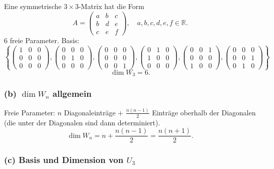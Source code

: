 \documentclass[a4paper,12pt]{article}
\begin{document}
Eine symmetrische $3\times 3$-Matrix hat die Form
\[
A = \begin{pmatrix} a & b & c \\ b & d & e \\ c & e & f \end{pmatrix}, \quad a, b, c, d, e, f \in \mathbb{R}.
\]
6 freie Parameter. Basis:
\[
\left\{
\begin{pmatrix} 1 & 0 & 0 \\ 0 & 0 & 0 \\ 0 & 0 & 0 \end{pmatrix},
\begin{pmatrix} 0 & 0 & 0 \\ 0 & 1 & 0 \\ 0 & 0 & 0 \end{pmatrix},
\begin{pmatrix} 0 & 0 & 0 \\ 0 & 0 & 0 \\ 0 & 0 & 1 \end{pmatrix},
\begin{pmatrix} 0 & 1 & 0 \\ 1 & 0 & 0 \\ 0 & 0 & 0 \end{pmatrix},
\begin{pmatrix} 0 & 0 & 1 \\ 0 & 0 & 0 \\ 1 & 0 & 0 \end{pmatrix},
\begin{pmatrix} 0 & 0 & 0 \\ 0 & 0 & 1 \\ 0 & 1 & 0 \end{pmatrix}
\right\}
\]
\[\dim W_3 = 6.\]

\subsubsection*{(b) $\dim W_n$ allgemein}

Freie Parameter: $n$ Diagonaleintr\"age $+$ $\tfrac{n(n-1)}{2}$ Eintr\"age oberhalb der Diagonalen (die unter der Diagonalen sind dann determiniert).
\[
\dim W_n = n + \frac{n(n-1)}{2} = \frac{n(n+1)}{2}.
\]

\subsubsection*{(c) Basis und Dimension von $U_3$}
\end{document}
